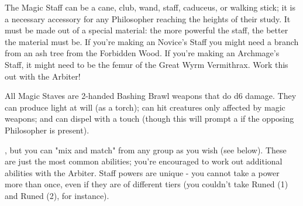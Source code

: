 




The Magic Staff can be a cane, club, wand, staff, caduceus, or walking stick; it is a necessary accessory for any Philosopher reaching the heights of their study. It must be made out of a special material: the more powerful the staff, the better the material must be.  If you're making an Novice's Staff you might need a branch from an ash tree from the Forbidden Wood.  If you're making an Archmage's Staff, it might need to be the femur of the Great Wyrm Vermithrax.  Work this out with the Arbiter!

All Magic Staves are 2-handed \DEX Bashing Brawl weapons that do d6 damage.  They can produce light at will (as a torch); can hit creatures only affected by magic weapons; and can dispel  with a touch (though this will prompt a  if the opposing Philosopher is present).

, but you can "mix and match" from any group as you wish (see below). These are just the most common abilities; you're encouraged to work out additional abilities with the Arbiter. Staff powers are unique - you cannot take a power more than once, even if they are of different tiers (you couldn't take Runed (1) and Runed (2), for instance).

\cbreak




